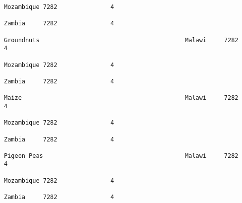 \documentclass[11pt]{article}
\begin{document}
\begin{Verbatim}[commandchars=\\\{\}]
                                                                                                                                                                                                                 Mozambique 7282               4  
                                                                                                                                                                                                                 Zambia     7282               4  
                                                                                                                                                              Groundnuts                                         Malawi     7282               4  
                                                                                                                                                                                                                 Mozambique 7282               4  
                                                                                                                                                                                                                 Zambia     7282               4  
                                                                                                                                                              Maize                                              Malawi     7282               4  
                                                                                                                                                                                                                 Mozambique 7282               4  
                                                                                                                                                                                                                 Zambia     7282               4  
                                                                                                                                                              Pigeon Peas                                        Malawi     7282               4  
                                                                                                                                                                                                                 Mozambique 7282               4  
                                                                                                                                                                                                                 Zambia     7282               4  

\end{Verbatim}
\end{document}
